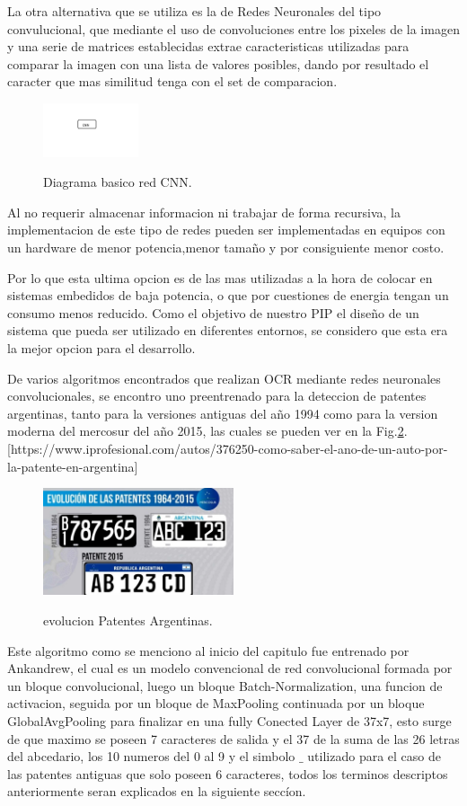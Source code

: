 La otra alternativa que se utiliza es la de Redes Neuronales del tipo convulucional, que mediante 
el uso de convoluciones entre los pixeles de la imagen y una serie de matrices establecidas
extrae caracteristicas utilizadas para comparar la imagen con una lista de valores posibles,
dando por resultado el caracter que mas similitud tenga con el set de comparacion.
\begin{figure}[h]
    \centering
    \includegraphics[width=0.25\textwidth]{imgs/CNN-diagrama.jpg}
    \label{fig:diagrama-CNN}
    \caption{Diagrama basico red CNN.}
    \end{figure}

Al no requerir almacenar informacion ni trabajar de forma recursiva, la implementacion
de este tipo de redes pueden ser implementadas en equipos con un hardware de menor potencia,menor tamaño y 
por consiguiente menor costo.

Por lo que esta ultima opcion es de las mas utilizadas a la hora de colocar en sistemas embedidos de baja 
potencia, o que por cuestiones de energia tengan un consumo menos reducido. Como el objetivo de nuestro PIP el diseño
de un sistema que pueda ser utilizado en diferentes entornos, se considero que esta era la mejor opcion para 
el desarrollo.

De varios algoritmos encontrados que realizan OCR mediante redes neuronales convolucionales, se encontro uno
preentrenado para la deteccion de patentes argentinas, tanto para la versiones antiguas del año 1994 como para la version moderna del 
mercosur del año 2015, las cuales se pueden ver en la Fig.\ref{fig:patentes-arg}. [https://www.iprofesional.com/autos/376250-como-saber-el-ano-de-un-auto-por-la-patente-en-argentina]
\begin{figure}[h]
    \centering
    \includegraphics[width=0.5\textwidth]{imgs/patentes-arg.png}
    \label{fig:patentes-arg}
    \caption{evolucion Patentes Argentinas.}
\end{figure}
Este algoritmo como se menciono al inicio del capitulo fue entrenado por Ankandrew, el cual es un modelo convencional de red convolucional 
formada por un bloque convolucional, luego un bloque Batch-Normalization, una funcion de activacion, seguida por un bloque de MaxPooling 
continuada por un bloque GlobalAvgPooling para finalizar en una fully Conected Layer de 37x7, esto surge de que maximo se poseen 7 caracteres
de salida y el 37 de la suma de las 26 letras del abcedario, los 10 numeros del 0 al 9 y el simbolo $\_$ utilizado para el caso de las patentes antiguas 
que solo poseen 6 caracteres, todos los terminos descriptos anteriormente seran explicados en la siguiente seccíon.

